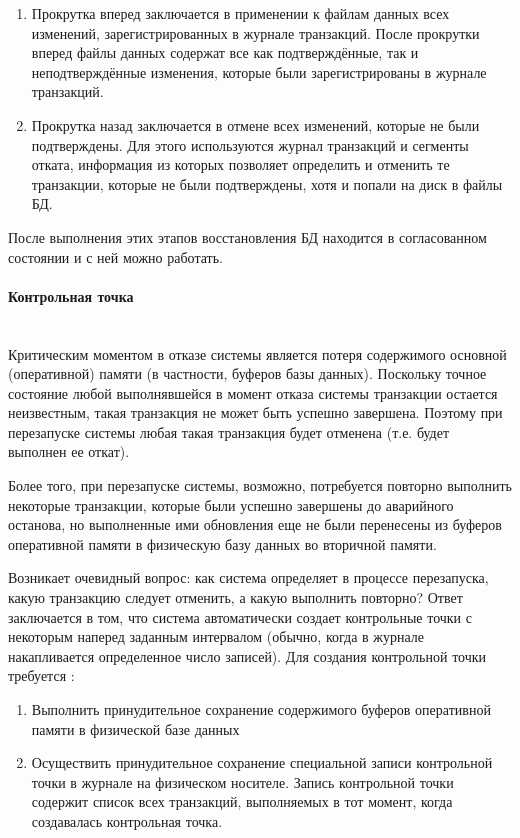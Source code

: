 \begin{enumerate}
    \item Прокрутка вперед заключается в применении к файлам данных всех изменений, зарегистрированных в журнале транзакций. После прокрутки вперед файлы данных содержат все как подтверждённые, так и неподтверждённые изменения, которые были зарегистрированы в журнале транзакций.
    \item Прокрутка назад заключается в отмене всех изменений, которые не были подтверждены. Для этого используются журнал транзакций и сегменты отката, информация из которых позволяет определить и отменить те транзакции, которые не были подтверждены, хотя и попали на диск в файлы БД.
\end{enumerate}

После выполнения этих этапов восстановления БД находится в согласованном состоянии и с ней можно работать.

\paragraph{Контрольная точка} ~\\

Критическим моментом в отказе системы является потеря содержимого основной (оперативной) памяти (в частности, буферов базы данных). Поскольку точное состояние любой выполнявшейся в момент отказа системы транзакции остается неизвестным, такая транзакция не может быть успешно завершена. Поэтому при перезапуске системы любая такая транзакция будет отменена (т.е. будет выполнен ее откат). 


Более того, при перезапуске системы, возможно, потребуется повторно выполнить некоторые транзакции, которые были успешно завершены до аварийного останова, но выполненные ими обновления еще не были перенесены из буферов оперативной памяти в физическую базу данных во вторичной памяти.


Возникает очевидный вопрос: как система определяет в процессе перезапуска, какую транзакцию следует отменить, а какую выполнить повторно? Ответ заключается в том, что система автоматически создает контрольные точки с некоторым наперед заданным интервалом (обычно, когда в журнале накапливается определенное число записей). Для создания контрольной точки требуется \autocite{Date2005}:

\begin{enumerate}
    \item Выполнить принудительное сохранение содержимого буферов оперативной памяти в физической базе данных 
    \item Осуществить принудительное сохранение специальной записи контрольной точки в журнале на физическом носителе. Запись контрольной точки содержит список всех транзакций, выполняемых в тот момент, когда создавалась контрольная точка.
\end{enumerate}

